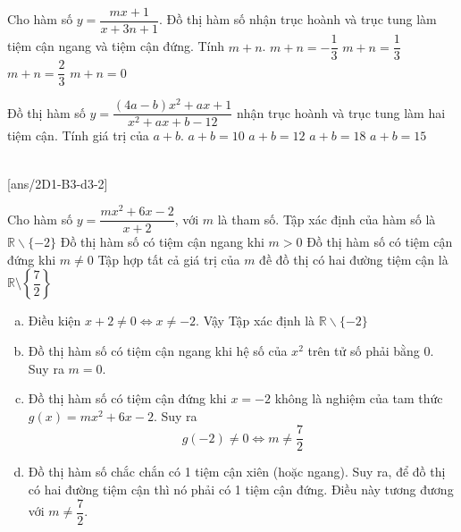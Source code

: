 \begin{ex}%
	Cho hàm số $y=\dfrac{mx+1}{x+3n+1}$. Đồ thị hàm số nhận trục hoành và trục tung làm tiệm cận ngang và tiệm cận đứng. Tính $m+n$.
	\choice
	{\True $m+n=-\dfrac{1}{3}$}
	{$m+n=\dfrac{1}{3}$}
	{$m+n=\dfrac{2}{3}$}
	{$m+n=0$}
\end{ex}

\begin{ex}%
	Đồ thị hàm số $y=\dfrac{(4a-b)x^2+ax+1}{x^2+ax+b-12}$ nhận trục hoành và trục tung làm hai tiệm cận. Tính giá trị của $a+b$.
	\choice
	{$a+b=10$}
	{$a+b=12$}
	{$a+b=18$}
	{\True $a+b=15$}
\end{ex}


 \\
[ans/2D1-B3-d3-2]
\begin{ex}%
	Cho hàm số $y=\dfrac{mx^2+6x-2}{x+2}$, với $m$ là tham số.
	\choiceTF
	{\True Tập xác định của hàm số là $\mathbb{R}\backslash\{-2\}$}
	{Đồ thị hàm số có tiệm cận ngang khi $m>0$}
	{Đồ thị hàm số có tiệm cận đứng khi $m\ne 0$}
	{\True Tập hợp tất cả giá trị của $m$ đề đồ thị có hai đường tiệm cận là $\mathbb{R}\setminus\left\{\dfrac{7}{2}\right\}$}
	\loigiai
	{
		\begin{enumerate}[a)]
			\item Điều kiện $x+2 \ne 0 \Leftrightarrow x \ne -2$. Vậy Tập xác định là $\mathbb{R}\backslash\{-2\}$
			\item Đồ thị hàm số có tiệm cận ngang khi hệ số của $x^2$ trên tử số phải bằng 0. Suy ra $m=0$.
			\item Đồ thị hàm số có tiệm cận đứng khi $x=-2$ không là nghiệm của tam thức $g(x)=mx^2+6x-2$. Suy ra
			$$g(-2)\ne 0 \Leftrightarrow m \ne \dfrac{7}{2}$$
			\item Đồ thị hàm số chắc chắn có 1 tiệm cận xiên (hoặc ngang). Suy ra, để đồ thị có hai đường tiệm cận thì nó phải có 1 tiệm cận đứng. Điều này tương đương với $m \ne \dfrac{7}{2}$.
		\end{enumerate}
	}
\end{ex}

